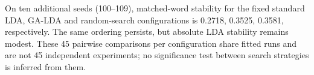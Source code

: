 On ten additional seeds (100--109), matched-word stability for the fixed standard LDA,
GA-LDA and random-search configurations is 0.2718, 0.3525, 0.3581,
respectively. The same ordering persists, but absolute LDA stability remains modest. These
45 pairwise comparisons per configuration share fitted runs and are not 45 independent
experiments; no significance test between search strategies is inferred from them.
